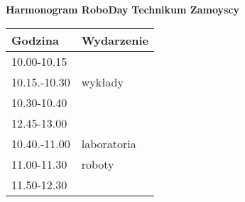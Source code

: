 \documentclass{article}
\begin{document}
\begin{center}
\Large\textbf{Harmonogram RoboDay}
\large\textbf{Technikum Zamoyscy}
\end{center}
\vspace{1cm}
\begin{center}
\begin{tabular}{|l|l|}
\hline
\textbf{Godzina} & \textbf{Wydarzenie} \\
\hline
10.00-10.15 &  \\
\hline
10.15.-10.30 & wykłady \\
\hline
10.30-10.40 &  \\
\hline
12.45-13.00 &  \\
\hline
10.40.-11.00 & laboratoria \\
\hline
11.00-11.30 & roboty \\
\hline
11.50-12.30 &  \\
\hline
\end{tabular}
\end{center}
\end{document}

